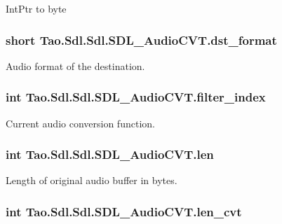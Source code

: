 IntPtr to byte \hypertarget{struct_tao_1_1_sdl_1_1_sdl_1_1_s_d_l___audio_c_v_t_ab7f9d5ab7996bb5d01a7fb9a3b0babb5}{
\subsubsection[{dst\_\-format}]{\setlength{\rightskip}{0pt plus 5cm}short {\bf Tao.Sdl.Sdl.SDL\_\-AudioCVT.dst\_\-format}}}
\label{struct_tao_1_1_sdl_1_1_sdl_1_1_s_d_l___audio_c_v_t_ab7f9d5ab7996bb5d01a7fb9a3b0babb5}


Audio format of the destination. 

\hypertarget{struct_tao_1_1_sdl_1_1_sdl_1_1_s_d_l___audio_c_v_t_a5ac13735d9e6e12c22626a1d40fcb1b8}{
\subsubsection[{filter\_\-index}]{\setlength{\rightskip}{0pt plus 5cm}int {\bf Tao.Sdl.Sdl.SDL\_\-AudioCVT.filter\_\-index}}}
\label{struct_tao_1_1_sdl_1_1_sdl_1_1_s_d_l___audio_c_v_t_a5ac13735d9e6e12c22626a1d40fcb1b8}


Current audio conversion function. 

\hypertarget{struct_tao_1_1_sdl_1_1_sdl_1_1_s_d_l___audio_c_v_t_a266a472d3486caac7c30d76decf93060}{
\subsubsection[{len}]{\setlength{\rightskip}{0pt plus 5cm}int {\bf Tao.Sdl.Sdl.SDL\_\-AudioCVT.len}}}
\label{struct_tao_1_1_sdl_1_1_sdl_1_1_s_d_l___audio_c_v_t_a266a472d3486caac7c30d76decf93060}


Length of original audio buffer in bytes. 

\hypertarget{struct_tao_1_1_sdl_1_1_sdl_1_1_s_d_l___audio_c_v_t_afa598d7f6ea5a01b48eb3a9abf6a1330}{
\subsubsection[{len\_\-cvt}]{\setlength{\rightskip}{0pt plus 5cm}int {\bf Tao.Sdl.Sdl.SDL\_\-AudioCVT.len\_\-cvt}}}
\label{struct_tao_1_1_sdl_1_1_sdl_1_1_s_d_l___audio_c_v_t_afa598d7f6ea5a01b48eb3a9abf6a1330}


